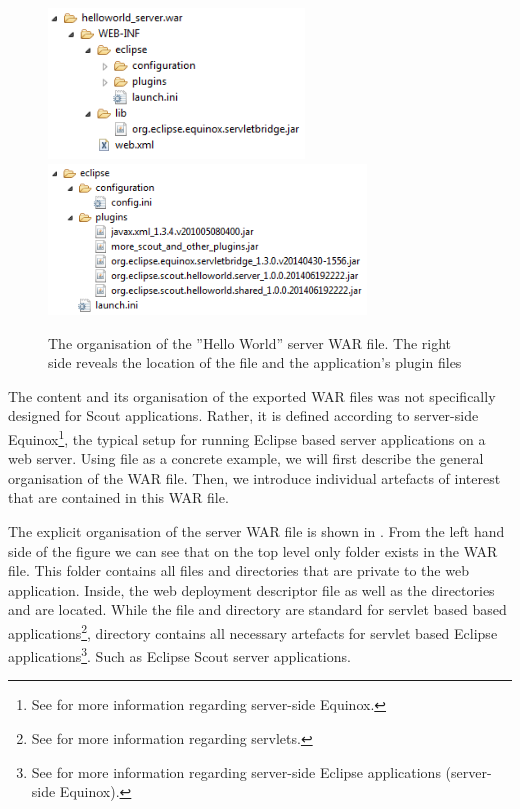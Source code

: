 \documentclass[a4paper,10pt,twoside]{book}
\begin{document}
\begin{figure}
\includegraphics[height=4cm]{helloworld_server_war.png} \hspace{5mm}
\includegraphics[height=4cm]{helloworld_server_war_eclipse.png}
\caption{The organisation of the ''Hello World'' server WAR file.
The right side reveals the location of the  file and the application's plugin files} 
\end{figure}

The content and its organisation of the exported WAR files was not specifically designed for Scout applications. 
Rather, it is defined according to server-side Equinox\footnote{
See  for more information regarding server-side Equinox.
},
the typical setup for running Eclipse based server applications on a web server.
Using file  as a concrete example, we will first describe the general organisation of the WAR file.
Then, we introduce individual artefacts of interest that are contained in this WAR file.

The explicit organisation of the server WAR file is shown in .
From the left hand side of the figure we can see that on the top level only folder  exists in the WAR file.
This folder contains all files and directories that are private to the web application.
Inside, the web deployment descriptor file  as well as the directories  and  are located.
While the  file and directory  are standard for servlet based based applications\footnote{
See  for more information regarding servlets.
},
directory  contains all necessary artefacts for servlet based Eclipse applications\footnote{
See  for more information regarding server-side Eclipse applications (server-side Equinox). 
}.
Such as Eclipse Scout server applications.
\end{document}
